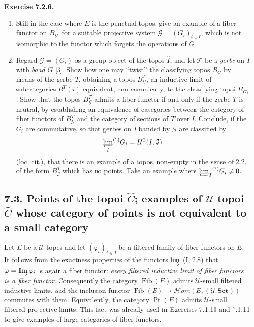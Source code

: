 \documentclass[11pt]{article}
\newcommand{\U}{\mathcal{U}}
\newcommand{\Set}{\mathbf{Set}}
\newcommand{\Ppoint}{\operatorname{Pt}}
\newcommand{\Ffib}{\operatorname{Fib}}
\newcommand{\Hhom}{\mathcal{H}om}
\newcommand{\loccit}{loc. cit.}
\newenvironment{remarktext}[1]{\par\medskip\noindent\textbf{#1.}\ }{\par\medskip}
\begin{document}
\begin{remarktext}{Exercise 7.2.6}
\begin{enumerate}[label=\alph*)]
\item Still in the case where \(E\) is the punctual topos, give an example of a fiber functor on \(B_{\mathcal G}\), for a suitable projective system \(\mathcal G=(G_i)_{i\in I}\), which is not isomorphic to the functor which forgets the operations of \(G\).

\item Regard \(\mathcal G=(G_i)\) as a group object of the topos \(\widehat I\), and let \(\mathcal T\) be a \emph{gerbe} on \(I\) with \emph{band} \(G\) [3]. Show how one may ``twist'' the classifying topos \(B_G\) by means of the gerbe \(T\), obtaining a topos \(B^T_{\mathcal G}\), an inductive limit of subcategories \(B^T(i)\) equivalent, non-canonically, to the classifying topoi \(B_{G_i}\). Show that the topos \(B^T_{\mathcal G}\) admits a fiber functor if and only if the gerbe \(T\) is neutral, by establishing an equivalence of categories between the category of fiber functors of \(B^T_{\mathcal G}\) and the category of sections of \(T\) over \(I\). Conclude, if the \(G_i\) are commutative, so that gerbes on \(I\) banded by \(\mathcal G\) are classified by
\[
{\varprojlim_I}^{(2)}G_i=H^2(I,\mathcal G)
\]
(\loccit), that there is an example of a topos, non-empty in the sense of 2.2, of the form \(B^T_{\mathcal G}\) which has no points. Take an example where \({\varprojlim_I}^{(2)}G_i\ne0\).
\end{enumerate}
\end{remarktext}

\subsection*{7.3. Points of the topoi \(\widehat C\); examples of \(\U\)-topoi \(\widehat C\) whose category of points is not equivalent to a small category}

Let \(E\) be a \(\U\)-topos and let \((\varphi_i)_{i\in I}\) be a filtered family of fiber functors on \(E\). It follows from the exactness properties of the functors \(\varinjlim\) (I, 2.8) that \(\varphi=\varinjlim\varphi_i\) is again a fiber functor: \emph{every filtered inductive limit of fiber functors is a fiber functor}. Consequently the category \(\Ffib(E)\) admits \(\U\)-small filtered inductive limits, and the inclusion functor \(\Ffib(E)\to\Hhom(E,(\U\text{-}\Set))\) commutes with them. Equivalently, the category \(\Ppoint(E)\) admits \(\U\)-small filtered projective limits. This fact was already used in Exercises 7.1.10 and 7.1.11 to give examples of large categories of fiber functors.
\end{document}
